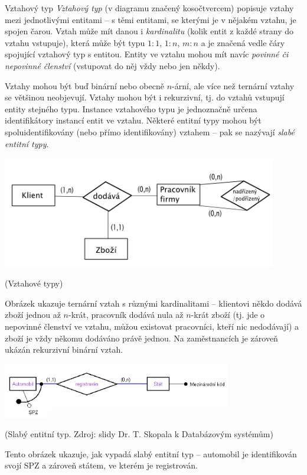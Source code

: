 \begin{obecne}{Vztahový typ}
\emph{Vztahový typ} (v diagramu značený kosočtvercem) popisuje vztahy mezi jednotlivými entitami -- s těmi entitami, se kterými je v nějakém vztahu, je spojen čarou. Vztah může mít danou i \emph{kardinalitu} (kolik entit z každé strany do vztahu vstupuje), která může být typu $1:1$, $1:n$, $m:n$ a je značená vedle čáry spojující vztahový typ s entitou. Entity ve vztahu mohou mít navíc \emph{povinné či nepovinné členství} (vstupovat do něj vždy nebo jen někdy).

Vztahy mohou být buď binární nebo obecně $n$-ární, ale více než ternární vztahy se většinou neobjevují. Vztahy mohou být i rekurzivní, tj. do vztahů vstupují entity stejného typu. Instance vztahového typu je jednoznačně určena identifikátory instancí entit ve vztahu. Některé entitní typy mohou být spoluidentifikovány (nebo přímo identifikovány) vztahem -- pak se nazývají \emph{slabé entitní typy}.

\begin{center}
\includegraphics[width=12cm]{informatika/databazy/obrazky/er2.png}

(Vztahové typy)
\end{center}
Obrázek ukazuje ternární vztah s různými kardinalitami -- klientovi někdo dodává zboží jednou až $n$-krát, pracovník dodává nula až $n$-krát zboží (tj. jde o nepovinné členství ve vztahu, můžou existovat pracovníci, kteří nic nedodávají) a zboží je vždy někomu dodáváno právě jednou. Na zaměstnancích je zároveň ukázán rekurzivní binární vztah.


\begin{center}
\includegraphics[width=10cm]{informatika/databazy/obrazky/er3.png}

(Slabý entitní typ. Zdroj: slidy Dr. T. Skopala k Databázovým systémům)
\end{center}
Tento obrázek ukazuje, jak vypadá slabý entitní typ -- automobil je identifikován svojí SPZ a zároveň státem, ve kterém je registrován.
\end{obecne}


